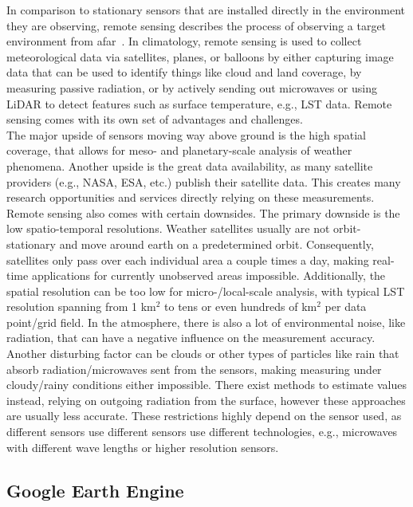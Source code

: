 In comparison to stationary sensors that are installed directly in the environment they are observing, remote sensing describes the process of observing a target environment from afar~\cite{campbell2011introduction}. In climatology, remote sensing is used to collect meteorological data via satellites, planes, or balloons by either capturing image data that can be used to identify things like cloud and land coverage, by measuring passive radiation, or by actively sending out microwaves or using LiDAR to detect features such as surface temperature, e.g., LST data. Remote sensing comes with its own set of advantages and challenges.\\
The major upside of sensors moving way above ground is the high spatial coverage, that allows for meso- and planetary-scale analysis of weather phenomena. Another upside is the great data availability, as many satellite providers (e.g., NASA, ESA, etc.) publish their satellite data. This creates many research opportunities and services directly relying on these measurements.\\
Remote sensing also comes with certain downsides. The primary downside is the low spatio-temporal resolutions. Weather satellites usually are not orbit-stationary and move around earth on a predetermined orbit. Consequently, satellites only pass over each individual area a couple times a day, making real-time applications for currently unobserved areas impossible. Additionally, the spatial resolution can be too low for micro-/local-scale analysis, with typical LST resolution spanning from 1 km$^{2}$ to tens or even hundreds of km$^{2}$ per data point/grid field. In the atmosphere, there is also a lot of environmental noise, like radiation, that can have a negative influence on the measurement accuracy. Another disturbing factor can be clouds or other types of particles like rain that absorb radiation/microwaves sent from the sensors, making measuring under cloudy/rainy conditions either impossible. There exist methods to estimate values instead, relying on outgoing radiation from the surface, however these approaches are usually less accurate. These restrictions highly depend on the sensor used, as different sensors use different sensors use different technologies, e.g., microwaves with different wave lengths or higher resolution sensors.

\subsection{Google Earth Engine}


